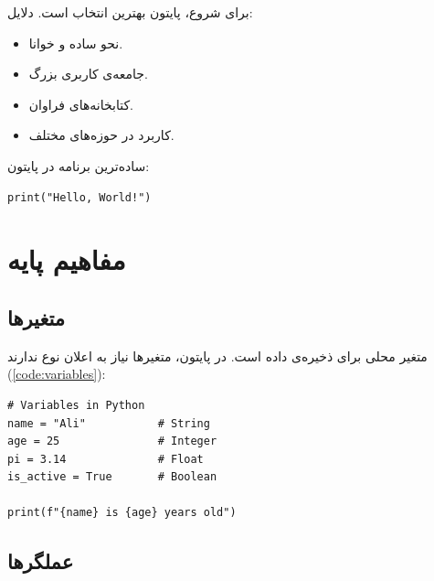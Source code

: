 \documentclass{matinbook}
\begin{document}
برای شروع، پایتون بهترین انتخاب است.
دلایل:

\begin{itemize}
    \item نحو ساده و خوانا.
    \item جامعه‌ی کاربری بزرگ.
    \item کتابخانه‌های فراوان.
    \item کاربرد در حوزه‌های مختلف.
\end{itemize}

\begin{example}
    ساده‌ترین برنامه در پایتون:

    \begin{latin}
\begin{verbatim}
print("Hello, World!")
\end{verbatim}
    \end{latin}
    \label{ex:hello-world}
\end{example}

\chapter{مفاهیم پایه}
\label{chap:basics}

\section{متغیرها}
\label{sec:basics-variables}

متغیر محلی برای ذخیره‌ی داده است. در
پایتون، متغیرها نیاز به اعلان نوع ندارند
(\cref{code:variables}):

\begin{latin}
\begin{verbatim}
# Variables in Python
name = "Ali"           # String
age = 25               # Integer
pi = 3.14              # Float
is_active = True       # Boolean

print(f"{name} is {age} years old")
\end{verbatim}
\end{latin}
\label{code:variables}

\section{عملگرها}
\label{sec:basics-operators}
\end{document}
